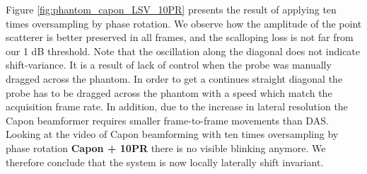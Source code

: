 \documentclass[journal]{IEEEtran}
\newcommand\multimedia[1]{\textbf{{\color{red}#1}}}
\begin{document}
Figure \ref{fig:phantom_capon_LSV_10PR} presents the result of applying ten times oversampling by phase rotation. We observe how the amplitude of the point scatterer is better preserved in all frames, and the scalloping loss is not far from our 1 dB threshold. Note that the oscillation along the diagonal does not indicate shift-variance. It is a result of lack of control when the probe was manually dragged across the phantom. In order to get a continues straight diagonal the probe has to be dragged across the phantom with a speed which match the acquisition frame rate. In addition, due to the increase in lateral resolution the Capon beamformer requires smaller frame-to-frame movements than DAS. Looking at the video of Capon beamforming with ten times oversampling by phase rotation \multimedia{Capon + 10PR} there is no visible blinking anymore. We therefore conclude that the system is now locally laterally shift invariant.



\end{document}
